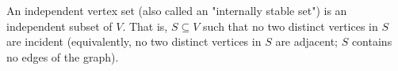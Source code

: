 An independent vertex set (also called an "internally stable set") is an independent subset of $V$. That is, $S \subseteq V$ such that no two distinct vertices in $S$ are incident (equivalently, no two distinct vertices in $S$ are adjacent; $S$ contains no edges of the graph).
